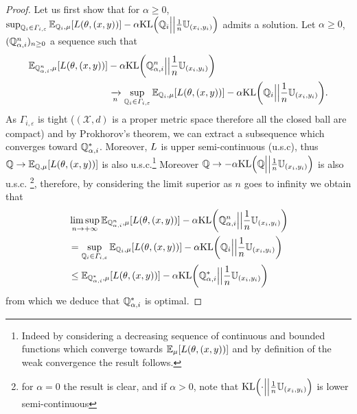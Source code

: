 \begin{proof}
Let us first show that for $\alpha\geq 0$, $\sup_{\QQ_i\in\Gamma_{i,\varepsilon}}\mathbb{E}_{\QQ_i,\mu}\left[\loss(\theta,(x,y))\right]-\alpha\text{KL}\left(\QQ_i\Big|\Big|\frac{1}{\numsamples}\mathbb{U}_{(x_i,y_i)}\right)$ admits a solution. Let $\alpha\geq 0$,
$(\mathbb{Q}_{\alpha,i}^{n})_{n\geq 0}$ a sequence such that
\begin{align*}
  \mathbb{E}_{\QQ_{\alpha,i}^{n},\mu}\left[\loss(\theta,(x,y))\right]&-\alpha\text{KL}\left(\QQ_{\alpha,i}^{n}\Big|\Big|\frac{1}{\numsamples}\mathbb{U}_{(x_i,y_i)}\right)\\
  &\xrightarrow[n]{} \sup_{\QQ_i\in\Gamma_{i,\varepsilon}}\mathbb{E}_{\QQ_i,\mu}\left[\loss(\theta,(x,y))\right]-\alpha\text{KL}\left(\QQ_i\Big|\Big|\frac{1}{\numsamples}\mathbb{U}_{(x_i,y_i)}\right).
\end{align*}
As $\Gamma_{i,\varepsilon}$ is tight ($(\mathcal{X},d)$ is a proper metric space therefore all the closed ball are compact) and by Prokhorov's theorem, we can extract a subsequence which converges  toward  $\mathbb{Q}^{*}_{\alpha,i}$. Moreover, $L$ is upper semi-continuous (u.s.c), thus $\QQ\rightarrow \mathbb{E}_{\QQ,\mu}\left[\loss(\theta,(x,y))\right]$ is also u.s.c.\footnote{Indeed by considering a decreasing sequence of continuous and bounded functions which converge towards $\mathbb{E}_{\mu}\left[\loss(\theta,(x,y))\right]$ and by definition of the weak convergence the result follows.} Moreover 
$\QQ\rightarrow - \alpha \text{KL}\left(\QQ\Big|\Big|\frac{1}{\numsamples}\mathbb{U}_{(x_i,y_i)}\right)$ is also u.s.c. \footnote{for $\alpha=0$ the result is clear, and if $\alpha>0$, note that $\text{KL}\left(\cdot\Big|\Big|\frac{1}{\numsamples}\mathbb{U}_{(x_i,y_i)}\right)$ is lower semi-continuous}, therefore, by considering the limit superior as $n$ goes to infinity we obtain that
\begin{align*}
    &\limsup_{n\to+\infty}\mathbb{E}_{\QQ_{\alpha,i}^{n},\mu}\left[\loss(\theta,(x,y))\right]-\alpha\text{KL}\left(\QQ_{\alpha,i}^{n}\Big|\Big|\frac{1}{\numsamples}\mathbb{U}_{(x_i,y_i)}\right)\\
    &=\sup_{\QQ_i\in\Gamma_{i,\varepsilon}}\mathbb{E}_{\QQ_i,\mu}\left[\loss(\theta,(x,y))\right]-\alpha\text{KL}\left(\QQ_i\Big|\Big|\frac{1}{\numsamples}\mathbb{U}_{(x_i,y_i)}\right)\\
    &\leq \mathbb{E}_{\QQ_{\alpha,i}^{*},\mu}\left[\loss(\theta,(x,y))\right]-\alpha\text{KL}\left(\QQ_{\alpha,i}^{*}\Big|\Big|\frac{1}{\numsamples}\mathbb{U}_{(x_i,y_i)}\right)
\end{align*}
from which we deduce that $\mathbb{Q}_{\alpha,i}^{*}$ is optimal.


\end{proof}
